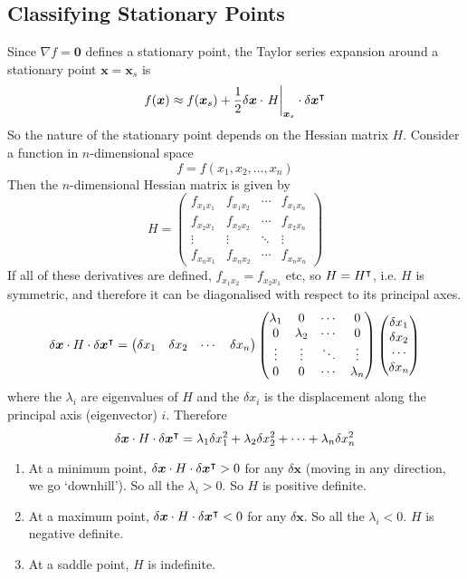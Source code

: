 \documentclass{article}
\begin{document}
\subsection{Classifying Stationary Points}
Since $\nabla f = \bm 0$ defines a stationary point, the Taylor series expansion around a stationary point $\bm x = \bm x_s$ is
\[ f(\bm x) \approx f(\bm x_s) + \frac{1}{2}\delta \bm x \cdot \eval{H}_{\bm x_s} \cdot \delta \bm x^\transpose \]
So the nature of the stationary point depends on the Hessian matrix $H$. Consider a function in $n$-dimensional space
\[ f = f(x_1, x_2, \dots, x_n) \]
Then the $n$-dimensional Hessian matrix is given by
\[ H = \begin{pmatrix}
		f_{x_1x_1} & f_{x_1x_2} & \cdots & f_{x_1x_n} \\
		f_{x_2x_1} & f_{x_2x_2} & \cdots & f_{x_2x_n} \\
		\vdots     & \vdots     & \ddots & \vdots     \\
		f_{x_nx_1} & f_{x_nx_2} & \cdots & f_{x_nx_n}
	\end{pmatrix} \]
If all of these derivatives are defined, $f_{x_1x_2} = f_{x_2x_1}$ etc, so $H = H^\intercal$, i.e. $H$ is symmetric, and therefore it can be diagonalised with respect to its principal axes.
\[ \delta \bm x \cdot H \cdot \delta \bm x^\intercal = \begin{pmatrix}
		\delta x_1 & \delta x_2 & \cdots & \delta x_n
	\end{pmatrix} \begin{pmatrix}
		\lambda_1 & 0         & \cdots & 0         \\
		0         & \lambda_2 & \cdots & 0         \\
		\vdots    & \vdots    & \ddots & \vdots    \\
		0         & 0         & \cdots & \lambda_n
	\end{pmatrix} \begin{pmatrix}
		\delta x_1 \\ \delta x_2 \\ \cdots \\ \delta x_n
	\end{pmatrix} \]
where the $\lambda_i$ are eigenvalues of $H$ and the $\delta x_i$ is the displacement along the principal axis (eigenvector) $i$. Therefore
\[ \delta \bm x \cdot H \cdot \delta \bm x^\intercal = \lambda_1 \delta x_1^2 + \lambda_2 \delta x_2^2 + \dots + \lambda_n \delta x_n^2 \]
\begin{enumerate}
	\item At a minimum point, $\delta \bm x \cdot H \cdot \delta \bm x^\intercal > 0$ for any $\delta \bm x$ (moving in any direction, we go `downhill'). So all the $\lambda_i > 0$. So $H$ is positive definite.
	\item At a maximum point, $\delta \bm x \cdot H \cdot \delta \bm x^\intercal < 0$ for any $\delta \bm x$. So all the $\lambda_i < 0$. $H$ is negative definite.
	\item At a saddle point, $H$ is indefinite.
\end{enumerate}
\end{document}
